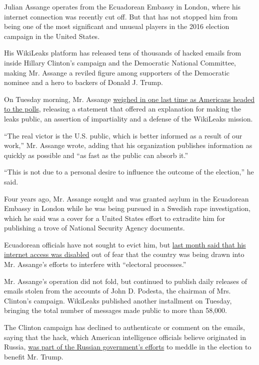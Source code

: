 Julian Assange operates from the Ecuadorean Embassy in London, where his
internet connection was recently cut off. But that has not stopped him
from being one of the most significant and unusual players in the 2016
election campaign in the United States.

His WikiLeaks platform has released tens of thousands of hacked emails
from inside Hillary Clinton's campaign and the Democratic National
Committee, making Mr. Assange a reviled figure among supporters of the
Democratic nominee and a hero to backers of Donald J. Trump.

On Tuesday morning, Mr. Assange
\href{https://wikileaks.org/Assange-Statement-on-the-US-Election.html}{weighed
in one last time as Americans headed to the polls}, releasing a
statement that offered an explanation for making the leaks public, an
assertion of impartiality and a defense of the WikiLeaks mission.

``The real victor is the U.S. public, which is better informed as a
result of our work,'' Mr. Assange wrote, adding that his organization
publishes information as quickly as possible and ``as fast as the public
can absorb it.''

``This is not due to a personal desire to influence the outcome of the
election,'' he said.

Four years ago, Mr. Assange sought and was granted asylum in the
Ecuadorean Embassy in London while he was being pursued in a Swedish
rape investigation, which he said was a cover for a United States effort
to extradite him for publishing a trove of National Security Agency
documents.

Ecuadorean officials have not sought to evict him, but
\href{http://www.nytimes3xbfgragh.onion/2016/10/19/world/europe/julian-assange-embassy.html}{last
month said that his internet access was disabled} out of fear that the
country was being drawn into Mr. Assange's efforts to interfere with
``electoral processes.''

Mr. Assange's operation did not fold, but continued to publish daily
releases of emails stolen from the accounts of John D. Podesta, the
chairman of Mrs. Clinton's campaign. WikiLeaks published another
installment on Tuesday, bringing the total number of messages made
public to more than 58,000.

The Clinton campaign has declined to authenticate or comment on the
emails, saying that the hack, which American intelligence officials
believe originated in Russia,
\href{http://www.nytimes3xbfgragh.onion/2016/09/01/world/europe/wikileaks-julian-assange-russia.html}{was
part of the Russian government's efforts} to meddle in the election to
benefit Mr. Trump.

